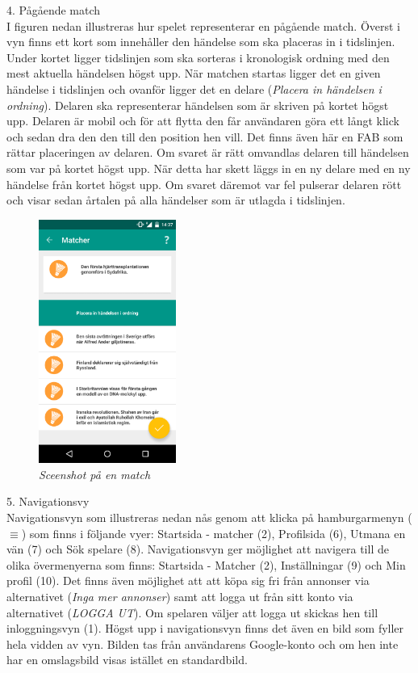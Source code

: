 \documentclass[a4paper, 11pt]{article}
\begin{document}
\pagebreak
 \large \textup{4. Pågående match}\\
I figuren nedan illustreras hur spelet representerar en pågående match. Överst i vyn finns ett kort som innehåller den händelse som ska placeras in i tidslinjen. Under kortet ligger tidslinjen som ska sorteras i kronologisk ordning med den mest aktuella händelsen högst upp. När matchen startas ligger det en given händelse i tidslinjen och ovanför ligger det en delare (\textit{Placera in händelsen i ordning}). Delaren ska representerar händelsen som är skriven på kortet högst upp. Delaren är mobil och för att flytta den får användaren göra ett långt klick och sedan dra den den till den position hen vill. Det finns även här en FAB som rättar placeringen av delaren. Om svaret är rätt omvandlas delaren till händelsen som var på kortet högst upp. När detta har skett läggs in en ny delare med en ny händelse från kortet högst upp. Om svaret däremot var fel pulserar delaren rött och visar sedan årtalen på alla händelser som är utlagda i tidslinjen.


\begin{figure}[H]
	\begin{center}
	\includegraphics[width=0.4\textwidth]{app_match} 
	\end{center}
	\caption{\textit{Sceenshot på en match}}
\end{figure}



\pagebreak
\large \textup{5. Navigationsvy}\\
Navigationsvyn som illustreras nedan nås genom att klicka på hamburgarmenyn ($\equiv$) som finns i följande vyer: Startsida - matcher (2), Profilsida (6), Utmana en vän (7) och Sök spelare (8). Navigationsvyn ger möjlighet att navigera till de olika övermenyerna som finns: Startsida - Matcher (2), Inställningar (9) och Min profil (10). Det finns även möjlighet att att köpa sig fri från annonser via alternativet (\textit{Inga mer annonser}) samt att logga ut från sitt konto via alternativet (\textit{LOGGA UT}). Om spelaren väljer att logga ut skickas hen till inloggningsvyn (1). 
Högst upp i navigationsvyn finns det även en bild som fyller hela vidden av vyn. Bilden tas från användarens Google-konto och om hen inte har en omslagsbild visas istället en standardbild.   
\end{document}
